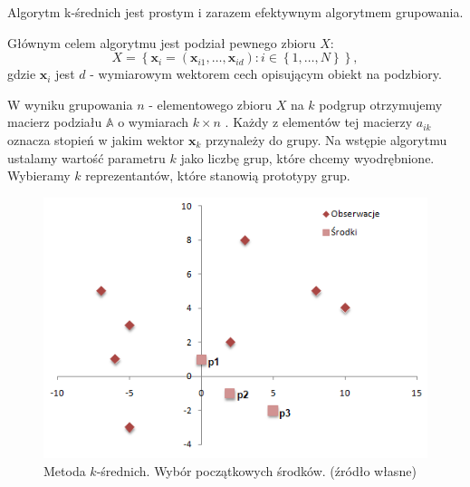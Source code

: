 \documentclass[12pt,a4paper]{report}
\newcommand{\set}[1]{\left\lbrace {#1} \right\rbrace}
\begin{document}
Algorytm k-średnich jest prostym i zarazem efektywnym algorytmem grupowania.

Głównym celem algorytmu jest podział pewnego zbioru $\mathit{X}$:
$$
\mathit{X} = \set{\mathbf{x}_i = (\mathbf{x}_{i1},\ldots,\mathbf{x}_{id}) : i \in \set{1,\ldots,N}},
$$
gdzie $\mathbf{x}_i$ jest $d$ - wymiarowym wektorem cech opisującym obiekt na podzbiory.

W wyniku grupowania $n$ - elementowego zbioru $\mathit{X}$ na $k$ podgrup otrzymujemy macierz podziału $\mathbb{A}$ o wymiarach $k\times n$ . Każdy z elementów tej macierzy $a_{ik}$ oznacza stopień w jakim wektor $\mathbf{x}_k$ przynależy do grupy. Na wstępie algorytmu ustalamy wartość parametru $k$ jako liczbę grup, które chcemy wyodrębnione. Wybieramy $k$ reprezentantów, które stanowią prototypy grup.
\begin{center}
\begin{figure}[H]
\centering
\includegraphics[scale=0.8]{obrazy/ks_0.PNG} 
\caption{Metoda $k$-średnich. Wybór początkowych środków. (źródło własne)}
\end{figure}
\end{center}
\end{document}
